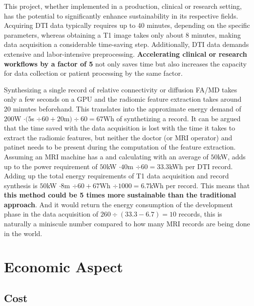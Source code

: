 This project, whether implemented in a production, clinical or research setting, has the potential to significantly enhance sustainability in its respective fields. Acquiring \ac{DTI} data typically requires up to 40 minutes, depending on the specific parameters, whereas obtaining a T1 image takes only about 8 minutes, making data acquisition a considerable time-saving step. Additionally, \ac{DTI} data demands extensive and labor-intensive preprocessing. \textbf{Accelerating clinical or research workflows by a factor of 5} not only saves time but also increases the capacity for data collection or patient processing by the same factor.\par
Synthesizing a single record of relative connectivity or diffusion \ac{FA}/\ac{MD} takes only a few seconds on a GPU and the radiomic feature extraction takes around 20 minutes beforehand. This translates into the approximate energy demand of $200$W $ \cdot (5$s $ \div 60 + 20$m$) \div 60 = 67$Wh of synthetizing a record. It can be argued that the time saved with the data acquisition is lost with the time it takes to extract the radiomic features, but neither the doctor (or MRI operator) and patinet needs to be present during the computation of the feature extraction. Assuming an MRI machine has a  and calculating with an average of $50$kW, adds up to the power requirement of $50$kW $ \cdot 40$m $ \div 60 = 33.3$kWh per \ac{DTI} record. Adding up the total energy requirements of T1 data acquisition and record synthesis is $50$kW $ \cdot 8$m $ \div 60 + 67$Wh $ \div 1000 = 6.7$kWh per record. This means that \textbf{this method could be 5 times more sustainable than the traditional approach}. And it would return the energy consumption of the development phase in the data acquisition of $260 \div (33.3 - 6.7) = 10$ records, this is naturally a miniscule number compared to how many MRI records are being done in the world.

\section{Economic Aspect}

\subsection{Cost}

